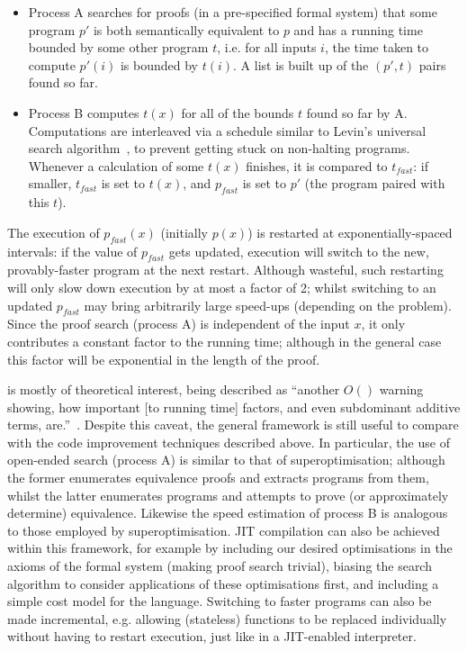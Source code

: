 \begin{itemize}
\item Process A searches for proofs (in a pre-specified formal system) that some
  program $p\prime$ is both semantically equivalent to $p$ and has a running
  time bounded by some other program $t$, i.e. for all inputs $i$, the
  time taken to compute $p\prime(i)$ is bounded by $t(i)$. A list is built up of
  the $(p\prime, t)$ pairs found so far.
\item Process B computes $t(x)$ for all of the bounds $t$ found so far by A.
  Computations are interleaved via a schedule similar to Levin's universal
  search algorithm~\iffalse TODO: Cite \fi, to prevent getting stuck on
  non-halting programs. Whenever a calculation of some $t(x)$ finishes, it is
  compared to $t_{fast}$: if smaller, $t_{fast}$ is set to $t(x)$, and $p_{fast}$ is
  set to $p\prime$ (the program paired with this $t$).
\end{itemize}

The execution of $p_{fast}(x)$ (initially $p(x)$) is restarted at
exponentially-spaced intervals: if the value of $p_{fast}$ gets updated,
execution will switch to the new, provably-faster program at the next restart.
Although wasteful, such restarting will only slow down execution by at most a
factor of 2; whilst switching to an updated $p_{fast}$ may bring arbitrarily large
speed-ups (depending on the problem). Since the proof search (process A) is
independent of the input $x$, it only contributes a constant factor to the
running time; although in the general case this factor will be exponential in
the length of the proof.

\hsearch{} is mostly of theoretical interest, being described as ``another $O()$
warning showing, how important [to running time] factors, and even subdominant
additive terms, are.''~\cite[p. 4]{HUTTER:2002}. Despite this caveat, the
general framework is still useful to compare with the code improvement
techniques described above. In particular, the use of open-ended search (process
A) is similar to that of superoptimisation; although the former enumerates
equivalence proofs and extracts programs from them, whilst the latter enumerates
programs and attempts to prove (or approximately determine)
equivalence. Likewise the speed estimation of process B is analogous to those
employed by superoptimisation. JIT compilation can also be achieved within this
framework, for example by including our desired optimisations in the axioms of
the formal system (making proof search trivial), biasing the search algorithm to
consider applications of these optimisations first, and including a simple cost
model for the language. Switching to faster programs can also be made
incremental, e.g. allowing (stateless) functions to be replaced individually
without having to restart execution, just like in a JIT-enabled interpreter.

